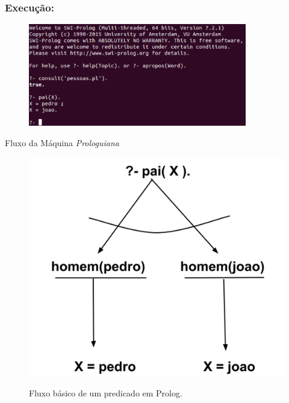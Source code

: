 \documentclass[sans]{beamer}
\begin{document}
\begin{frame}[fragile]
\frametitle{Execução:}
\begin{figure}[!htb]
\centering
\includegraphics[width=0.85\textwidth , height=0.65\textheight]{figuras/pessoas.pdf}
\label{fig_recurs_3}
\end{figure}


\end{frame}

\begin{frame}
\begin{block}{Fluxo da Máquina \textit{Prologuiana}}

\begin{figure}[!htb]
\centering
\includegraphics[scale = 0.2]{figuras/fluxo-da-maquina-prolog-01.pdf}
\label{fig_fluxo_px}
\caption{Fluxo básico de um predicado em Prolog.}
\end{figure}

\end{block}   
\end{frame}
\end{document}
